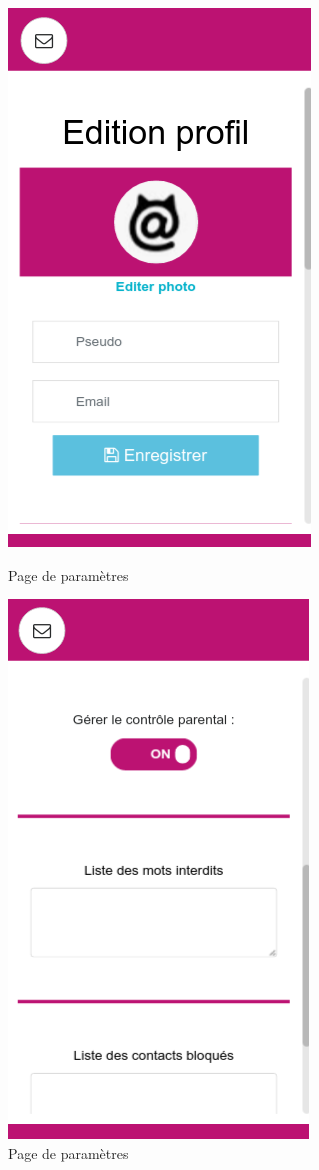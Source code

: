 \begin{figure}[H]
   \begin{minipage}[c]{.46\linewidth}
		\centering \includegraphics[scale=0.5]{img/07Param.png}
		\caption{Page de paramètres}
   \end{minipage} \hfill
   \begin{minipage}[c]{.46\linewidth}
		\centering \includegraphics[scale=0.5]{img/08paramsuite.png}
		\caption{Page de paramètres}
   \end{minipage}
\end{figure}

